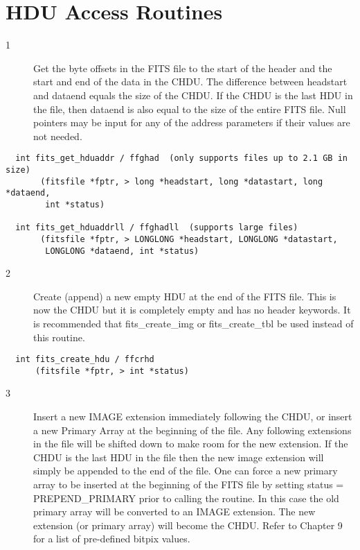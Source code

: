 \documentclass[11pt]{book}
\begin{document}
\section{HDU Access Routines}


\begin{description}
\item[1 ] Get the byte offsets in the FITS file to the start of the header
    and the start and end of the data in the CHDU. The difference
    between headstart and dataend equals the size of the CHDU.  If the
    CHDU is the last HDU in the file, then dataend is also equal to the
    size of the entire FITS file.  Null pointers may be input for any
   of the address parameters if their values are not needed. \label{ffghad}
\end{description}

\begin{verbatim}
  int fits_get_hduaddr / ffghad  (only supports files up to 2.1 GB in size)
       (fitsfile *fptr, > long *headstart, long *datastart, long *dataend,
        int *status)

  int fits_get_hduaddrll / ffghadll  (supports large files)
       (fitsfile *fptr, > LONGLONG *headstart, LONGLONG *datastart,
        LONGLONG *dataend, int *status)
\end{verbatim}

\begin{description}
\item[2 ] Create (append) a new empty HDU at the end of the FITS file.
    This is now  the CHDU but it is completely empty and has
    no header keywords.  It is recommended that fits\_create\_img or
 fits\_create\_tbl be used instead of this routine. \label{ffcrhd}
\end{description}

\begin{verbatim}
  int fits_create_hdu / ffcrhd
      (fitsfile *fptr, > int *status)
\end{verbatim}

\begin{description}
\item[3 ] Insert a new IMAGE extension immediately following the CHDU, or
    insert a new Primary Array at the beginning of the file.  Any
    following extensions in the file will be shifted down to make room
    for the new extension.  If the CHDU is the last HDU in the file
    then the new image extension will simply be appended to the end of
    the file.   One can force a new primary array to be inserted at the
    beginning of the FITS file by setting status = PREPEND\_PRIMARY prior
    to calling the routine.  In this case the old primary array will be
    converted to an IMAGE extension. The new extension (or primary
    array) will become the CHDU.  Refer to Chapter 9 for a list of
   pre-defined bitpix values.  \label{ffiimg}
\end{description}
\end{document}
